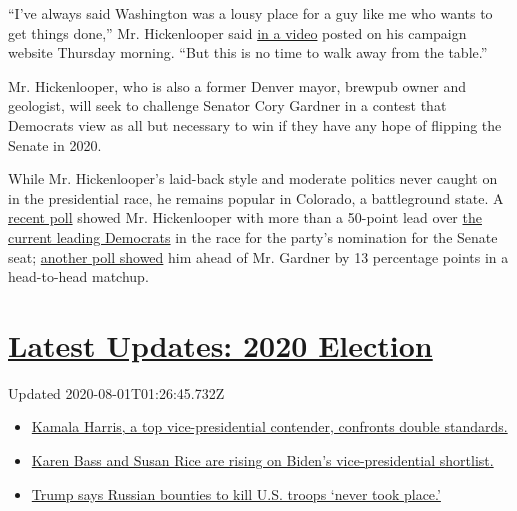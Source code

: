 ``I've always said Washington was a lousy place for a guy like me who
wants to get things done,'' Mr. Hickenlooper said
\href{https://www.youtube.com/watch?v=-63689Ahyuk}{in a video} posted on
his campaign website Thursday morning. ``But this is no time to walk
away from the table.''

Mr. Hickenlooper, who is also a former Denver mayor, brewpub owner and
geologist, will seek to challenge Senator Cory Gardner in a contest that
Democrats view as all but necessary to win if they have any hope of
flipping the Senate in 2020.

While Mr. Hickenlooper's laid-back style and moderate politics never
caught on in the presidential race, he remains popular in Colorado, a
battleground state. A
\href{https://www.denverpost.com/2019/08/12/john-hickenlooper-2020-senate-cory-gardner/}{recent
poll} showed Mr. Hickenlooper with more than a 50-point lead over
\href{https://ewscripps.brightspotcdn.com/26/f4/625f79044305a2f3bd9b98ce8c4f/kr-colorado-senate-dp-voter-poll-july-2019-xtabs.pdf}{the
current leading Democrats} in the race for the party's nomination for
the Senate seat;
\href{https://documentcloud.adobe.com/link/track?uri=urn:aaid:scds:US:f9273f93-44fc-411d-ab25-6e88b356e58d}{another
poll showed} him ahead of Mr. Gardner by 13 percentage points in a
head-to-head matchup.

\hypertarget{latest-updates-2020-election}{%
\section{\texorpdfstring{\href{https://www.nytimes.com/2020/07/31/us/elections/biden-vs-trump.html?action=click\&pgtype=Article\&state=default\&region=MAIN_CONTENT_1\&context=storylines_live_updates}{Latest
Updates: 2020
Election}}{Latest Updates: 2020 Election}}\label{latest-updates-2020-election}}

Updated 2020-08-01T01:26:45.732Z

\begin{itemize}
\tightlist
\item
  \href{https://www.nytimes.com/2020/07/31/us/elections/biden-vs-trump.html?action=click\&pgtype=Article\&state=default\&region=MAIN_CONTENT_1\&context=storylines_live_updates\#link-29fdff45}{Kamala
  Harris, a top vice-presidential contender, confronts double
  standards.}
\item
  \href{https://www.nytimes.com/2020/07/31/us/elections/biden-vs-trump.html?action=click\&pgtype=Article\&state=default\&region=MAIN_CONTENT_1\&context=storylines_live_updates\#link-13ec3d9c}{Karen
  Bass and Susan Rice are rising on Biden's vice-presidential
  shortlist.}
\item
  \href{https://www.nytimes.com/2020/07/31/us/elections/biden-vs-trump.html?action=click\&pgtype=Article\&state=default\&region=MAIN_CONTENT_1\&context=storylines_live_updates\#link-49e9a016}{Trump
  says Russian bounties to kill U.S. troops `never took place.'}
\end{itemize}

